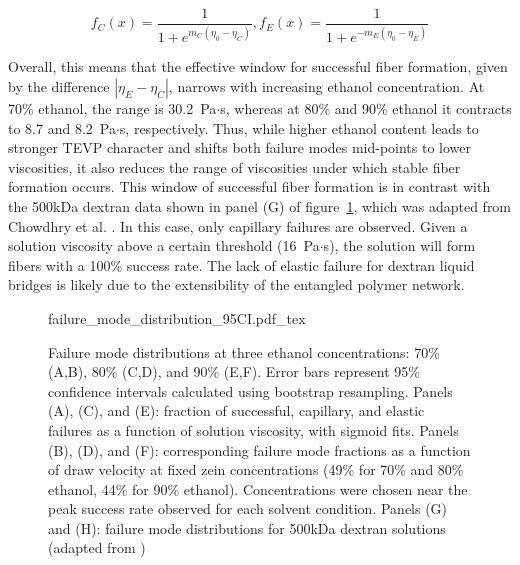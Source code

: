 \documentclass[lineno]{JFM-FLM_Au}
\begin{document}
\begin{subequations}\label{eq:sigmoids}
  \begin{equation}
	  f_C(x) = \frac{1}{1 + e^{m_C(\eta_0 - \eta_C)}},
	  \label{eq:sigmoid_c}
  \end{equation}
  \begin{equation}
	f_E(x) = \frac{1}{1 + e^{-m_E(\eta_0 - \eta_E)}}
	\label{eq:sigmoid_e}
  \end{equation}
\end{subequations}

Overall, this means that the effective window for successful fiber formation, given by the difference $|\eta_E - \eta_C|$, narrows with increasing ethanol concentration. At 70\% ethanol, the range is 30.2~Pa$\cdot$s, whereas at 80\% and 90\% ethanol it contracts to 8.7 and 8.2~Pa$\cdot$s, respectively. Thus, while higher ethanol content leads to stronger TEVP character and shifts both failure modes mid-points to lower viscosities, it also reduces the range of viscosities under which stable fiber formation occurs. This window of successful fiber formation is in contrast with the 500kDa dextran data shown in panel (G) of figure~\ref{fig:failure_modes}, which was adapted from Chowdhry et al. \cite{chowdhry_polymer_2021}. In this case, only capillary failures are observed. Given a solution viscosity above a certain threshold (16~Pa$\cdot$s), the solution will form fibers with a 100\% success rate. The lack of elastic failure for dextran liquid bridges is likely due to the extensibility of the entangled polymer network.


\begin{figure}[tbp]
  \centering
  \def\svgwidth{0.8\textwidth} %
  {failure_mode_distribution_95CI.pdf_tex}
	\caption{
		Failure mode distributions at three ethanol concentrations: 70\% (A,B), 80\% (C,D), and 90\% (E,F). 
		Error bars represent 95\% confidence intervals calculated using bootstrap resampling.
		Panels (A), (C), and (E): fraction of successful, capillary, and elastic failures as a function of solution viscosity, with sigmoid fits. 
		Panels (B), (D), and (F): corresponding failure mode fractions as a function of draw velocity at fixed zein concentrations (49\% for 70\% and 80\% ethanol, 44\% for 90\% ethanol). 
		Concentrations were chosen near the peak success rate observed for each solvent condition.
		Panels (G) and (H): failure mode distributions for 500kDa dextran solutions (adapted from \cite{chowdhry_polymer_2021})
	}
	\label{fig:failure_modes}
\end{figure}
\end{document}
